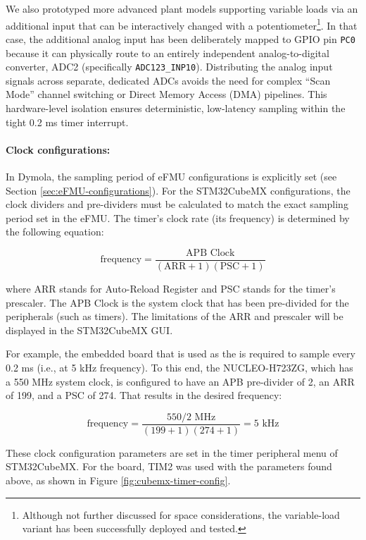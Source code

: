 We also prototyped more advanced plant models supporting variable loads via an additional input that can be interactively changed with a potentiometer\footnote{Although not further discussed for space considerations, the variable-load variant has been successfully deployed and tested.}. In that case, the additional analog input has been deliberately mapped to GPIO pin \texttt{PC0} because it can physically route to an entirely independent analog-to-digital converter, ADC2 (specifically \texttt{ADC123\_INP10}). Distributing the analog input signals across separate, dedicated ADCs avoids the need for complex ``Scan Mode'' channel switching or Direct Memory Access (DMA) pipelines. This hardware-level isolation ensures deterministic, low-latency sampling within the tight 0.2 ms timer interrupt.

\paragraph{Clock configurations:} In Dymola, the sampling period of eFMU configurations is explicitly set (see Section \ref{sec:eFMU-configurations}). For the STM32CubeMX configurations, the clock dividers and pre-dividers must be calculated to match the exact sampling period set in the eFMU. The timer's clock rate (its frequency) is determined by the following equation:

\begin{equation*}
    \text{frequency} = \frac{\text{APB Clock}}{(\text{ARR}+1)(\text{PSC}+1)}
\end{equation*}

\noindent{}where ARR stands for Auto-Reload Register and PSC stands for the timer's prescaler. The APB Clock is the system clock that has been pre-divided for the peripherals (such as timers). The limitations of the ARR and prescaler will be displayed in the STM32CubeMX GUI. 

For example, the embedded board that is used as the \plant{} is required to sample every 0.2 ms (i.e., at 5 kHz frequency). To this end, the NUCLEO-H723ZG, which has a 550 MHz system clock, is configured to have an APB pre-divider of 2, an ARR of 199, and a PSC of 274. That results in the desired frequency:

\begin{equation*}
    \text{frequency} = \frac{550/2 \text{ MHz}}{(199+1)(274+1)} = 5 \text{ kHz}
\end{equation*}

\noindent{}These clock configuration parameters are set in the timer peripheral menu of STM32CubeMX. For the \plant{} board, TIM2 was used with the parameters found above, as shown in Figure \ref{fig:cubemx-timer-config}.

